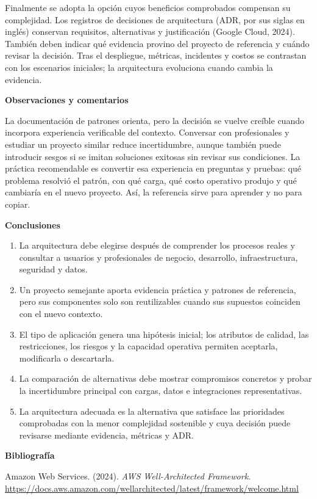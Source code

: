 \documentclass[12pt,letterpaper]{article}
\newcommand{\seccion}[1]{%
  \vspace{4pt}%
  {\noindent\textbf{#1}\par}%
  \vspace{1pt}%
}
\newcommand{\referencia}[1]{%
  \par\hangindent=1.27cm\hangafter=1 #1\par
}
\begin{document}
Finalmente se adopta la opción cuyos beneficios comprobados compensan su complejidad. Los registros de decisiones de arquitectura (ADR, por sus siglas en inglés) conservan requisitos, alternativas y justificación (Google Cloud, 2024). También deben indicar qué evidencia provino del proyecto de referencia y cuándo revisar la decisión. Tras el despliegue, métricas, incidentes y costos se contrastan con los escenarios iniciales; la arquitectura evoluciona cuando cambia la evidencia.

\seccion{Observaciones y comentarios}
La documentación de patrones orienta, pero la decisión se vuelve creíble cuando incorpora experiencia verificable del contexto. Conversar con profesionales y estudiar un proyecto similar reduce incertidumbre, aunque también puede introducir sesgos si se imitan soluciones exitosas sin revisar sus condiciones. La práctica recomendable es convertir esa experiencia en preguntas y pruebas: qué problema resolvió el patrón, con qué carga, qué costo operativo produjo y qué cambiaría en el nuevo proyecto. Así, la referencia sirve para aprender y no para copiar.

\seccion{Conclusiones}
\begin{enumerate}
  \item La arquitectura debe elegirse después de comprender los procesos reales y consultar a usuarios y profesionales de negocio, desarrollo, infraestructura, seguridad y datos.
  \item Un proyecto semejante aporta evidencia práctica y patrones de referencia, pero sus componentes solo son reutilizables cuando sus supuestos coinciden con el nuevo contexto.
  \item El tipo de aplicación genera una hipótesis inicial; los atributos de calidad, las restricciones, los riesgos y la capacidad operativa permiten aceptarla, modificarla o descartarla.
  \item La comparación de alternativas debe mostrar compromisos concretos y probar la incertidumbre principal con cargas, datos e integraciones representativas.
  \item La arquitectura adecuada es la alternativa que satisface las prioridades comprobadas con la menor complejidad sostenible y cuya decisión puede revisarse mediante evidencia, métricas y ADR.
\end{enumerate}

\seccion{Bibliografía}
\referencia{Amazon Web Services. (2024). \textit{AWS Well-Architected Framework}. \url{https://docs.aws.amazon.com/wellarchitected/latest/framework/welcome.html}}
\end{document}
